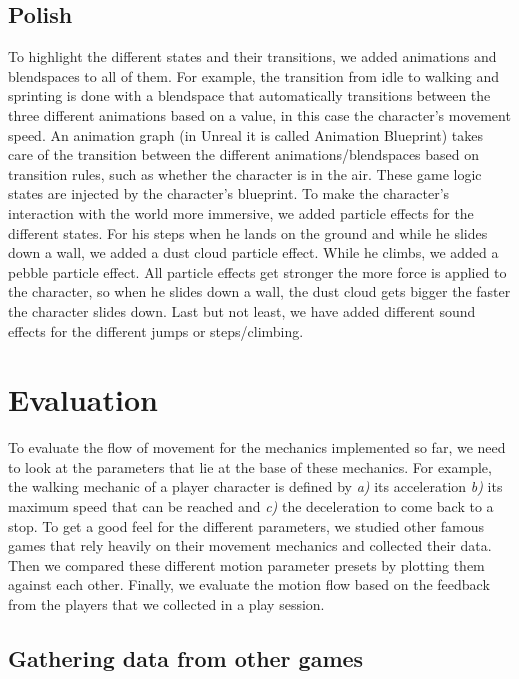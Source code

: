 \documentclass[letterpaper, 10 pt, conference]{ieeeconf}  %
\begin{document}
\subsection{Polish}

To highlight the different states and their transitions, we added animations and blendspaces to all of them.
For example, the transition from idle to walking and sprinting is done with a blendspace that automatically transitions between the three different animations based on a value, in this case the character's movement speed.
An animation graph (in Unreal it is called Animation Blueprint) takes care of the transition between the different animations/blendspaces based on transition rules, such as whether the character is in the air.
These game logic states are injected by the character's blueprint.
To make the character's interaction with the world more immersive, we added particle effects for the different states.
For his steps when he lands on the ground and while he slides down a wall, we added a dust cloud particle effect.
While he climbs, we added a pebble particle effect.
All particle effects get stronger the more force is applied to the character, so when he slides down a wall, the dust cloud gets bigger the faster the character slides down.
Last but not least, we have added different sound effects for the different jumps or steps/climbing.


\section{Evaluation}
\label{Sec:Evaluation}

To evaluate the flow of movement for the mechanics implemented so far, we need to look at the parameters that lie at the base of these mechanics.
For example, the walking mechanic of a player character is defined by \textit{a)} its acceleration \textit{b)} its maximum speed that can be reached and \textit{c)} the deceleration to come back to a stop.
To get a good feel for the different parameters, we studied other famous games that rely heavily on their movement mechanics and collected their data.
Then we compared these different motion parameter presets by plotting them against each other.
Finally, we evaluate the motion flow based on the feedback from the players that we collected in a play session.

\subsection{Gathering data from other games}
\end{document}
